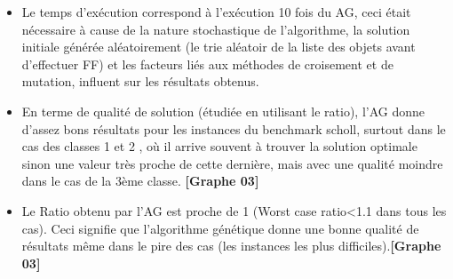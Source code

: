 \documentclass{report}
\begin{document}
\newline
\begin{itemize}
	\item Le temps d’exécution correspond à l’exécution 10 fois du AG, ceci était nécessaire à cause de la nature stochastique de l’algorithme,  la solution initiale générée aléatoirement (le trie aléatoir de la liste des objets avant d’effectuer FF) et les facteurs liés aux méthodes de croisement et de mutation, influent sur les résultats obtenus.
	\item En terme de qualité de solution (étudiée en utilisant le ratio), l'AG donne d’assez bons résultats pour les instances du benchmark scholl, surtout dans le cas des classes 1 et 2 , où il arrive souvent à trouver la solution optimale sinon une valeur très proche de cette dernière, mais avec une qualité moindre dans le cas de la 3ème classe. \textbf{[Graphe 03] }
	\item Le Ratio obtenu par l’AG est proche de 1 (Worst case ratio<1.1 dans tous les cas). Ceci signifie que l’algorithme génétique donne une bonne qualité de résultats même dans le pire des cas (les instances les plus difficiles).\textbf{[Graphe 03] }
\end{itemize}
\end{document}
